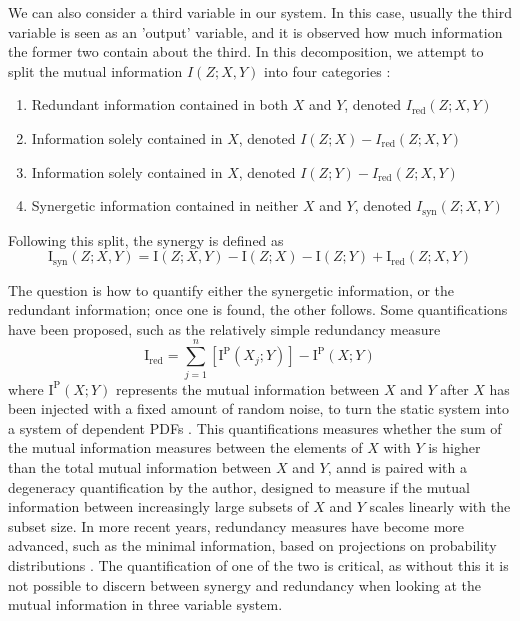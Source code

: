 \documentclass[../main.tex]{subfiles}
\begin{document}
We can also consider a third variable in our system.
In this case, usually the third variable is seen as an 'output' variable, and it is observed how much information the former two contain about the third.
In this decomposition, we attempt to split the mutual information $I(Z;X,Y)$ into four categories \cite{williams2010nonnegative}:
%
\begin{enumerate}
\item Redundant information contained in both $X$ and $Y$, denoted $I_\mathrm{red}(Z;X,Y)$
\item Information solely contained in $X$, denoted $I(Z; X) - I_\mathrm{red}(Z;X,Y)$
\item Information solely contained in $X$, denoted $I(Z; Y) - I_\mathrm{red}(Z;X,Y)$
\item Synergetic information contained in neither $X$ and $Y$, denoted $I_\mathrm{syn}(Z;X,Y)$
\end{enumerate}

Following this split, the synergy is defined as
%
\begin{equation}
\mathrm{I}_\mathrm{syn}(Z;X,Y) = \mathrm{I}(Z;X, Y) - \mathrm{I}(Z; X) - \mathrm{I}(Z; Y) + \mathrm{I}_\mathrm{red}(Z;X,Y)
\end{equation}

The question is how to quantify either the synergetic information, or the redundant information; once one is found, the other follows.
Some quantifications have been proposed, such as the relatively simple redundancy measure
%
\begin{equation}
\mathrm{I}_\mathrm{red} = \sum_{j=1}^n [\mathrm{I}^\mathrm{P}(X_j;Y)] - \mathrm{I}^\mathrm{P}(X;Y)
\end{equation}
%
where $\mathrm{I}^\mathrm{P}(X;Y)$ represents the mutual information between $X$ and $Y$ after $X$ has been injected with a fixed amount of random noise, to turn the static system into a system of dependent PDFs \cite{tononi1999measures}.
This quantifications measures whether the sum of the mutual information measures between the elements of $X$ with $Y$ is higher than the total mutual information between $X$ and $Y$, annd is paired with a degeneracy quantification by the author, designed to measure if the mutual information between increasingly large subsets of $X$ and $Y$ scales linearly with the subset size.
In more recent years, redundancy measures have become more advanced, such as the minimal information, based on projections on probability distributions \cite{harder2013bivariate}.
The quantification of one of the two is critical, as without this it is not possible to discern between synergy and redundancy when looking at the mutual information in three variable system.
\end{document}
